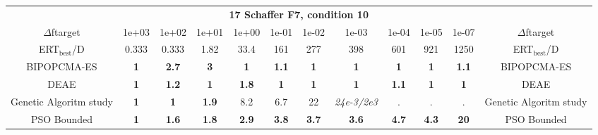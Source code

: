 \begin{tabular}{cccccccccccc}
 & \multicolumn{10}{c}{{\normalsize \textbf{17 Schaffer F7, condition 10}}}\\
$\Delta$ftarget& 1e+03& 1e+02& 1e+01& 1e+00& 1e-01& 1e-02& 1e-03& 1e-04& 1e-05& 1e-07 & $\Delta$ftarget \\
ERT$_{\textrm{best}}$/D& 0.333& 0.333& 1.82& 33.4& 161& 277& 398& 601& 921& 1250 & ERT$_{\textrm{best}}$/D \\
\hline
BIPOPCMA-ES & \textbf{1} & \textbf{2.7} & \textbf{3} & \textbf{1} & \textbf{1.1} & \textbf{1} & \textbf{1} & \textbf{1} & \textbf{1} & \textbf{1.1} & BIPOPCMA-ES \cite{add_an_entry_for_BIPOPCMA-ES_in_bbob.bib}\\
DEAE & \textbf{1} & \textbf{1.2} & \textbf{1} & \textbf{1.8} & \textbf{1} & \textbf{1} & \textbf{1} & \textbf{1.1} & \textbf{1} & \textbf{1} & DEAE \cite{add_an_entry_for_DEAE_in_bbob.bib}\\
Genetic Algoritm study & \textbf{1} & \textbf{1} & \textbf{1.9} & 8.2 & 6.7 & 22 & \textit{24e-3}\textit{/2e3} & . & . & . & Genetic Algoritm study \cite{add_an_entry_for_Genetic Algoritm study_in_bbob.bib}\\
PSO Bounded & \textbf{1} & \textbf{1.6} & \textbf{1.8} & \textbf{2.9} & \textbf{3.8} & \textbf{3.7} & \textbf{3.6} & \textbf{4.7} & \textbf{4.3} & \textbf{20} & PSO Bounded \cite{add_an_entry_for_PSO Bounded_in_bbob.bib}
\end{tabular}
